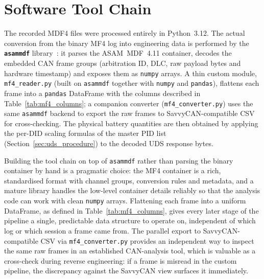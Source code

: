 \documentclass[11pt,a4paper,oneside,parskip=half]{scrreprt}
\begin{document}
\section{Software Tool Chain}
\label{sec:toolchain}
The recorded MDF4 files were processed entirely in Python~3.12. The actual conversion from the binary MF4 log into engineering data is performed by the \textbf{\texttt{asammdf}} library~\cite{asammdf}: it parses the ASAM~MDF~4.11 container, decodes the embedded CAN frame groups (arbitration ID, DLC, raw payload bytes and hardware timestamp) and exposes them as \texttt{numpy} arrays. A thin custom module, \texttt{mf4\_reader.py} (built on \texttt{asammdf} together with \texttt{numpy} and \texttt{pandas}), flattens each frame into a \texttt{pandas} DataFrame with the columns described in Table~\ref{tab:mf4_columns}; a companion converter (\texttt{mf4\_converter.py}) uses the same \texttt{asammdf} backend to export the raw frames to SavvyCAN-compatible CSV for cross-checking. The physical battery quantities are then obtained by applying the per-DID scaling formulas of the master PID list (Section~\ref{sec:uds_procedure}) to the decoded UDS response bytes.

Building the tool chain on top of \texttt{asammdf} rather than parsing the binary container by hand is a pragmatic choice: the MF4 container is a rich, standardised format with channel groups, conversion rules and metadata, and a mature library handles the low-level container details reliably so that the analysis code can work with clean \texttt{numpy} arrays. Flattening each frame into a uniform DataFrame, as defined in Table~\ref{tab:mf4_columns}, gives every later stage of the pipeline a single, predictable data structure to operate on, independent of which log or which session a frame came from. The parallel export to SavvyCAN-compatible CSV via \texttt{mf4\_converter.py} provides an independent way to inspect the same raw frames in an established CAN-analysis tool, which is valuable as a cross-check during reverse engineering: if a frame is misread in the custom pipeline, the discrepancy against the SavvyCAN view surfaces it immediately.
\end{document}
